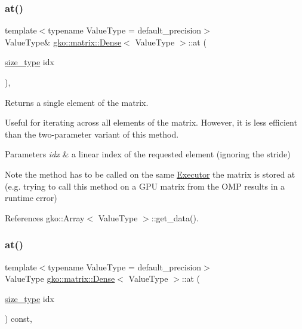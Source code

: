 \subsubsection{\texorpdfstring{at()}{at()}\hspace{0.1cm}{\footnotesize\ttfamily [3/4]}}
{\footnotesize\ttfamily template$<$typename Value\+Type = default\+\_\+precision$>$ \\
Value\+Type\& \hyperlink{classgko_1_1matrix_1_1Dense}{gko\+::matrix\+::\+Dense}$<$ Value\+Type $>$\+::at (\begin{DoxyParamCaption}\item[{\hyperlink{namespacegko_a6e5c95df0ae4e47aab2f604a22d98ee7}{size\+\_\+type}}]{idx }\end{DoxyParamCaption})\hspace{0.3cm}{\ttfamily [inline]}, {\ttfamily [noexcept]}}



Returns a single element of the matrix. 

Useful for iterating across all elements of the matrix. However, it is less efficient than the two-\/parameter variant of this method.


\begin{DoxyParams}{Parameters}
{\em idx} & a linear index of the requested element (ignoring the stride)\\
\hline
\end{DoxyParams}
\begin{DoxyNote}{Note}
the method has to be called on the same \hyperlink{classgko_1_1Executor}{Executor} the matrix is stored at (e.\+g. trying to call this method on a G\+PU matrix from the O\+MP results in a runtime error) 
\end{DoxyNote}


References gko\+::\+Array$<$ Value\+Type $>$\+::get\+\_\+data().

\mbox{\label{classgko_1_1matrix_1_1Dense_a34ba8a7f392c65c481a93d9374cb5769}} 
\subsubsection{\texorpdfstring{at()}{at()}\hspace{0.1cm}{\footnotesize\ttfamily [4/4]}}
{\footnotesize\ttfamily template$<$typename Value\+Type = default\+\_\+precision$>$ \\
Value\+Type \hyperlink{classgko_1_1matrix_1_1Dense}{gko\+::matrix\+::\+Dense}$<$ Value\+Type $>$\+::at (\begin{DoxyParamCaption}\item[{\hyperlink{namespacegko_a6e5c95df0ae4e47aab2f604a22d98ee7}{size\+\_\+type}}]{idx }\end{DoxyParamCaption}) const\hspace{0.3cm}{\ttfamily [inline]}, {\ttfamily [noexcept]}}



